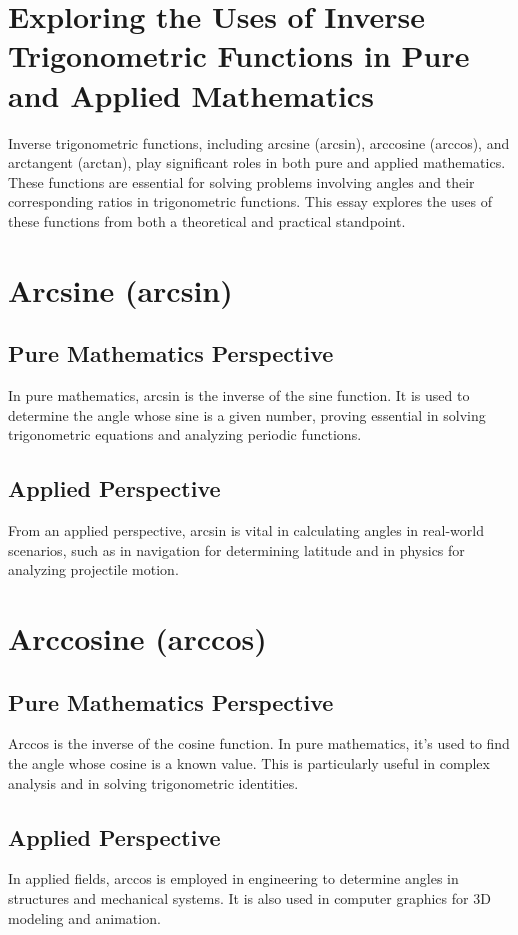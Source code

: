 \documentclass[a4paper,12pt]{book}
\newcounter{problem}
\begin{document}
\section*{Exploring the Uses of Inverse Trigonometric Functions in Pure and Applied Mathematics}
Inverse trigonometric functions, including arcsine (arcsin), arccosine (arccos), and arctangent (arctan), play significant roles in both pure and applied mathematics. These functions are essential for solving problems involving angles and their corresponding ratios in trigonometric functions. This essay explores the uses of these functions from both a theoretical and practical standpoint.

\section*{Arcsine (arcsin)}
\subsection*{Pure Mathematics Perspective}
In pure mathematics, arcsin is the inverse of the sine function. It is used to determine the angle whose sine is a given number, proving essential in solving trigonometric equations and analyzing periodic functions.

\subsection*{Applied Perspective}
From an applied perspective, arcsin is vital in calculating angles in real-world scenarios, such as in navigation for determining latitude and in physics for analyzing projectile motion.

\section*{Arccosine (arccos)}
\subsection*{Pure Mathematics Perspective}
Arccos is the inverse of the cosine function. In pure mathematics, it's used to find the angle whose cosine is a known value. This is particularly useful in complex analysis and in solving trigonometric identities.

\subsection*{Applied Perspective}
In applied fields, arccos is employed in engineering to determine angles in structures and mechanical systems. It is also used in computer graphics for 3D modeling and animation.
\end{document}
